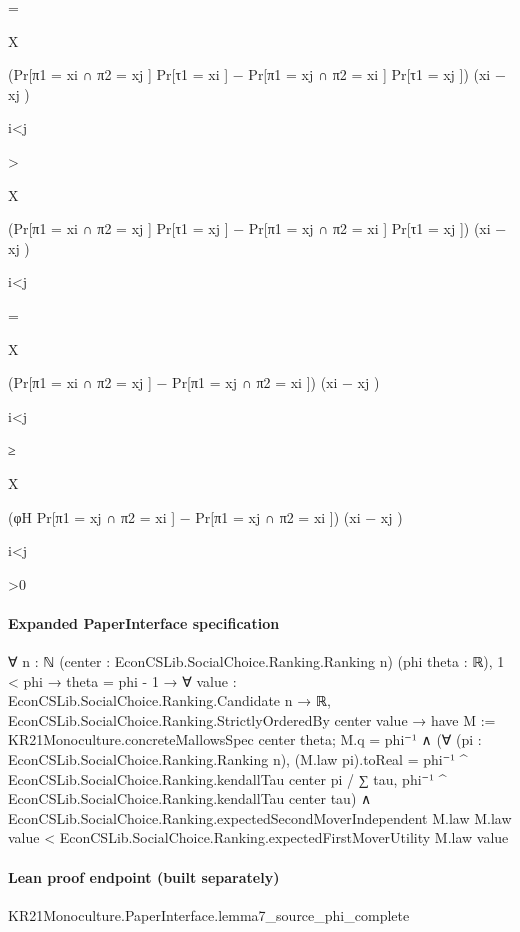\documentclass[10pt]{article}
\begin{document}
\begin{ReviewVerbatim}
=

X

(Pr[π1 = xi ∩ π2 = xj ] Pr[τ1 = xi ] − Pr[π1 = xj ∩ π2 = xi ] Pr[τ1 = xj ]) (xi − xj )

i<j

>

X

(Pr[π1 = xi ∩ π2 = xj ] Pr[τ1 = xj ] − Pr[π1 = xj ∩ π2 = xi ] Pr[τ1 = xj ]) (xi − xj )

i<j

=

X

(Pr[π1 = xi ∩ π2 = xj ] − Pr[π1 = xj ∩ π2 = xi ]) (xi − xj )

i<j

≥

X

(φH Pr[π1 = xj ∩ π2 = xi ] − Pr[π1 = xj ∩ π2 = xi ]) (xi − xj )

i<j

>0
\end{ReviewVerbatim}


\paragraph{Expanded PaperInterface specification}
\begin{ReviewVerbatim}
∀ {n : ℕ} (center : EconCSLib.SocialChoice.Ranking.Ranking n) (phi theta : ℝ),
  1 < phi →
    theta = phi - 1 →
      ∀ {value : EconCSLib.SocialChoice.Ranking.Candidate n → ℝ},
        EconCSLib.SocialChoice.Ranking.StrictlyOrderedBy center value →
          have M := KR21Monoculture.concreteMallowsSpec center theta;
          M.q = phi⁻¹ ∧
            (∀ (pi : EconCSLib.SocialChoice.Ranking.Ranking n),
                (M.law pi).toReal =
                  phi⁻¹ ^ EconCSLib.SocialChoice.Ranking.kendallTau center pi /
                    ∑ tau, phi⁻¹ ^ EconCSLib.SocialChoice.Ranking.kendallTau center tau) ∧
              EconCSLib.SocialChoice.Ranking.expectedSecondMoverIndependent M.law M.law value <
                EconCSLib.SocialChoice.Ranking.expectedFirstMoverUtility M.law value
\end{ReviewVerbatim}

\paragraph{Lean proof endpoint (built separately)}\begin{ReviewVerbatim}
KR21Monoculture.PaperInterface.lemma7_source_phi_complete
\end{ReviewVerbatim}
\end{document}
